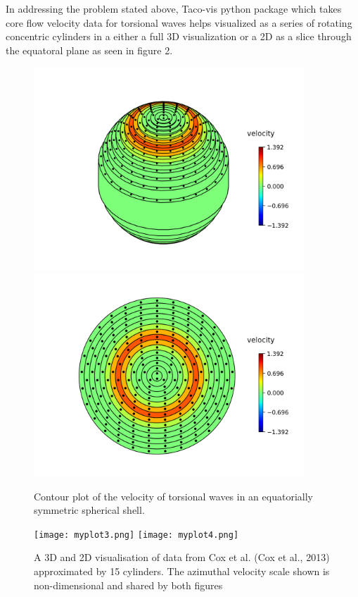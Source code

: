 \documentclass{article}
\begin{document}
In addressing the problem stated above, Taco-vis python package which takes core flow velocity data for torsional waves helps visualized as a series of rotating concentric cylinders in a either a full 3D visualization or a 2D as a slice through the equatoral plane as seen in figure 2.

\begin{figure}[H]
	    \centering
	        \includegraphics[height=3in]{myplot1.png}
		    \includegraphics[height=3in]{myplot2.png}
		        \caption{Contour plot of the velocity of torsional waves in an equatorially symmetric spherical shell.}\label{fig:mesh1}			    
\end{figure}
\begin{figure}[H]
	    \centering
	        \texttt{[image: myplot3.png]}
		    \texttt{[image: myplot4.png]} 
		        \caption{A 3D and 2D visualisation of data from Cox et al. (Cox et al., 2013) approximated by 15 cylinders. The azimuthal velocity scale shown is non-dimensional and shared by both figures}
			     \label{fig:mesh1}
\end{figure}
\end{document}
